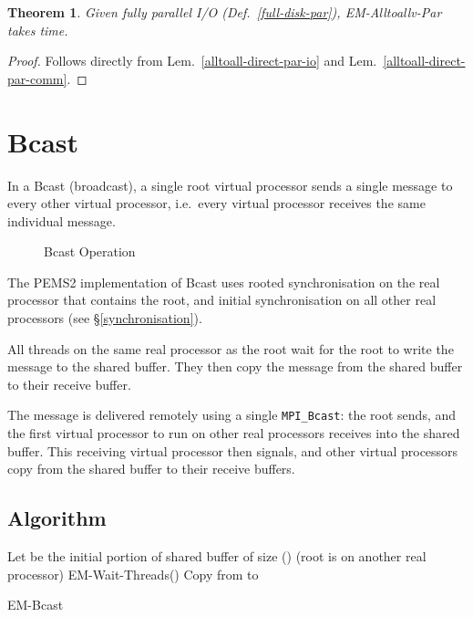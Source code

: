 \documentclass[12pt]{carletoncsthesis}
\newtheorem{thm}{Theorem}[section]
\begin{document}
\begin{thm}
\label{alltoall-direct-par-time}
Given fully parallel I/O (Def.~\ref{full-disk-par}), {\sc EM-Alltoallv-Par}
takes  time.
\end{thm}
\begin{proof}
Follows directly from Lem.~\ref{alltoall-direct-par-io} and
Lem.~\ref{alltoall-direct-par-comm}.
\end{proof}

\clearpage
\section{Bcast}
\label{bcast-sec}


In a {\sc Bcast} (broadcast), a single root virtual processor sends a single
message to every other virtual processor, i.e.\ every virtual processor
receives the same individual message.

\begin{figure}[ht]
\begin{center}
\caption{Bcast Operation}
\end{center}
\end{figure}

The PEMS2 implementation of Bcast uses rooted synchronisation on the real
processor that contains the root, and initial synchronisation on all other
real processors (see \S\ref{synchronisation}).

All threads on the same real processor as the root wait for the root to
write the message to the shared buffer.  They then copy the message from the shared
buffer to their receive buffer.

The message is delivered remotely using a single {\tt MPI\_Bcast}: the root
sends, and the first virtual processor to run on other real processors
receives into the shared buffer.  This receiving virtual processor then
signals, and other virtual processors copy from the shared buffer to their
receive buffers.

\clearpage
\subsection{Algorithm}


\begin{algorithm}
\BlankLine
Let  be the initial portion of shared buffer of size 
\BlankLine
{}
	\Else(){
		\Else(root is on another real processor){
			{\sc EM-Wait-Threads()}\;
			Copy from  to 
		}
	}
\BlankLine{}\BlankLine
\caption{{\sc EM-Bcast}}
\label{bcast-alg}
\end{algorithm}
\end{document}
